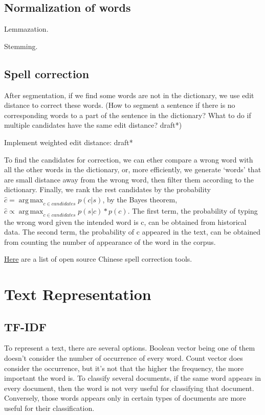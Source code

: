 \documentclass{report}
\DeclareMathOperator*{\argmax}{arg\,max}
\begin{document}
\section{Normalization of words}
Lemmazation.

Stemming.

\section{Spell correction}
After segmentation, if we find some words are not in the dictionary, we use edit distance to correct these words. (How to segment a sentence if there is no corresponding words to a part of the sentence in the dictionary? What to do if multiple candidates have the same edit distance? draft*)

Implement weighted edit distance: draft*

To find the candidates for correction, we can ether compare a wrong word with all the other words in the dictionary, or, more efficiently, we generate `words' that are small distance away from the wrong word, then filter them according to the dictionary. Finally, we rank the rest candidates by the probability $\hat{c} = \argmax_{c \in candidates} p(c|s)$, by the Bayes theorem, $\hat{c} \propto \argmax_{c \in candidates} p(s|c) * p(c)$. The first term, the probability of typing the wrong word given the intended word is c, can be obtained from historical data. The second term, the probability of c appeared in the text, can be obtained from counting the number of appearance of the word in the corpus.

\href{https://github.com/li-aolong/li-aolong.github.io/issues/12}{Here} are a list of open source Chinese spell correction tools.

\chapter{Text Representation}
\section{TF-IDF}
To represent a text, there are several options. Boolean vector being one of them doesn't consider the number of occurrence of every word. Count vector does consider the occurrence, but it's not that the higher the frequency, the more important the word is. To classify several documents, if the same word appears in every document, then the word is not very useful for classifying that document. Conversely, those words appears only in certain types of documents are more useful for their classification.
\end{document}
